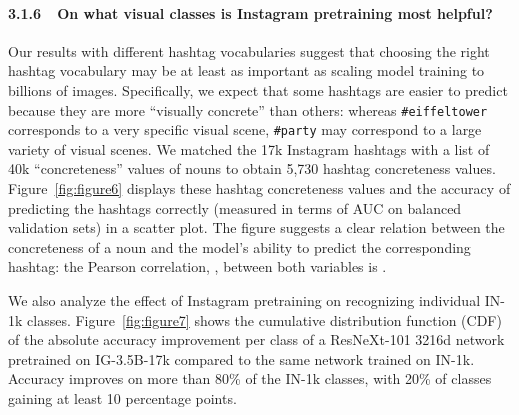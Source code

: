 \documentclass[runningheads]{llncs}
\begin{document}
\paragraph{3.1.6~~On what visual classes is Instagram pretraining most helpful?} Our results with different hashtag vocabularies suggest that choosing the right hashtag vocabulary may be at least as important as scaling model training to billions of images. Specifically, we expect that some hashtags are easier to predict because they are more ``visually concrete'' than others: whereas \texttt{\#eiffeltower} corresponds to a very specific visual scene, \texttt{\#party} may correspond to a large variety of visual scenes. We matched the 17k Instagram hashtags with a list of 40k ``concreteness'' values of nouns \cite{brysbaert2014concreteness} to obtain 5,730 hashtag concreteness values. Figure~\ref{fig:figure6} displays these hashtag concreteness values and the accuracy of predicting the hashtags correctly (measured in terms of AUC on balanced validation sets) in a scatter plot. The figure suggests a clear relation between the concreteness of a noun and the model's ability to predict the corresponding hashtag: the Pearson correlation, , between both variables is .

\begin{figure}[t!]
\begin{floatrow}
\end{floatrow}
\end{figure}


We also analyze the effect of Instagram pretraining on recognizing individual IN-1k classes. Figure~\ref{fig:figure7} shows the cumulative distribution function (CDF) of the absolute accuracy improvement per class of a ResNeXt-101 3216d network pretrained on IG-3.5B-17k compared to the same network trained on IN-1k. Accuracy improves on more than 80\% of the IN-1k classes, with 20\% of classes gaining at least 10 percentage points.
\end{document}
